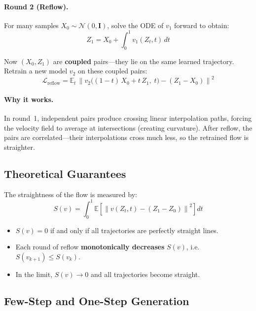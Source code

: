 \documentclass[11pt, a4paper]{article}
\newcommand{\E}{\mathbb{E}}
\newcommand{\N}{\mathcal{N}}
\newcommand{\Id}{\mathbf{I}}
\newcommand{\norm}[1]{\left\lVert #1 \right\rVert}
\begin{document}
\paragraph{Round 2 (Reflow).}
For many samples $X_0 \sim \N(0,\Id)$, solve the ODE of $v_1$ forward to
obtain:
\begin{equation}
  Z_1 = X_0 + \int_0^1 v_1(Z_t, t)\, dt
\end{equation}

Now $(X_0, Z_1)$ are \textbf{coupled} pairs---they lie on the same learned
trajectory.  Retrain a new model $v_2$ on these coupled pairs:
\begin{equation}
  \mathcal{L}_{\mathrm{reflow}}
  = \E_{t}\, \norm{v_2\bigl((1{-}t)\,X_0 + t\,Z_1,\; t\bigr)
    - (Z_1 - X_0)}^2
\end{equation}

\paragraph{Why it works.}
In round~1, independent pairs produce crossing linear interpolation paths,
forcing the velocity field to average at intersections (creating curvature).
After reflow, the pairs are correlated---their interpolations cross much less,
so the retrained flow is straighter.

\subsection{Theoretical Guarantees}

The straightness of the flow is measured by:
\begin{equation}
  \label{eq:straightness}
  S(v) = \int_0^1 \E\!\left[
    \norm{v(Z_t, t) - (Z_1 - Z_0)}^2
  \right] dt
\end{equation}

\begin{itemize}
  \item $S(v) = 0$ if and only if all trajectories are perfectly straight
        lines.
  \item Each round of reflow \textbf{monotonically decreases} $S(v)$, i.e.\
        $S(v_{k+1}) \le S(v_k)$.
  \item In the limit, $S(v) \to 0$ and all trajectories become straight.
\end{itemize}

\subsection{Few-Step and One-Step Generation}
\end{document}
